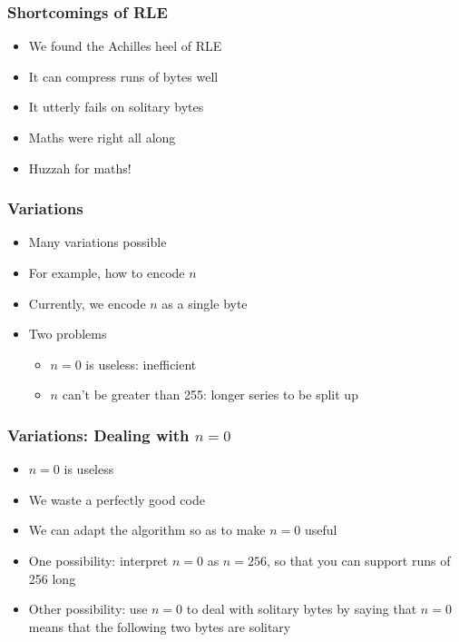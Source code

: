 \documentclass{../ucll-slides}
\begin{document}
\begin{frame}
  \frametitle{Shortcomings of RLE}
  \begin{itemize}
    \item We found the Achilles heel of RLE
    \item It can compress runs of bytes well
    \item It utterly fails on solitary bytes
    \item Maths were right all along
    \item Huzzah for maths!
  \end{itemize}
\end{frame}

\begin{frame}
  \frametitle{Variations}
  \begin{itemize}
    \item Many variations possible
    \item For example, how to encode $n$
    \item Currently, we encode $n$ as a single byte
    \item Two problems
          \begin{itemize}
            \item $n = 0$ is useless: inefficient
            \item $n$ can't be greater than 255: longer series to be split up
          \end{itemize}
  \end{itemize}
\end{frame}

\begin{frame}
  \frametitle{Variations: Dealing with $n = 0$}
  \begin{itemize}
    \item $n = 0$ is useless
    \item We waste a perfectly good code
    \item We can adapt the algorithm so as to make $n = 0$ useful
    \item One possibility: interpret $n = 0$ as $n = 256$, so that
          you can support runs of 256 long
    \item Other possibility: use $n = 0$ to deal with solitary bytes by
          saying that $n = 0$ means that the following two bytes are solitary
  \end{itemize}
\end{frame}
\end{document}
